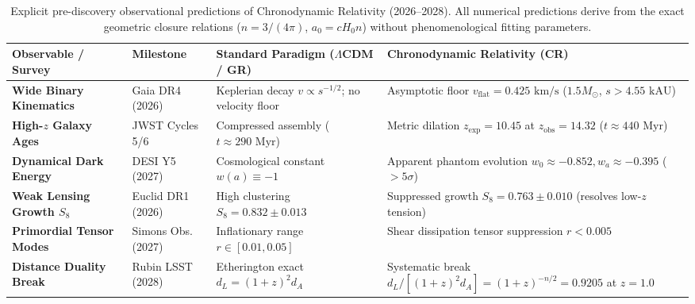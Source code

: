 \documentclass[aps,prd,reprint,superscriptaddress,nofootinbib,floatfix,amsmath,amssymb]{revtex4-2}
\begin{document}
\begin{table}[t]
\caption{\label{tab:upcoming_predictions}Explicit pre-discovery observational predictions of Chronodynamic Relativity (2026--2028). All numerical predictions derive from the exact geometric closure relations ($n = 3/(4\pi)$, $a_0 = c H_0 n$) without phenomenological fitting parameters.}
\begin{ruledtabular}
\begin{tabular}{llll}
\textbf{Observable / Survey} & \textbf{Milestone} & \textbf{Standard Paradigm ($\Lambda$CDM / GR)} & \textbf{Chronodynamic Relativity (CR)} \\
\hline
\parbox[t]{2.8cm}{\textbf{Wide Binary Kinematics}} & \parbox[t]{1.8cm}{Gaia DR4\\(2026)} & \parbox[t]{3.8cm}{Keplerian decay $v \propto s^{-1/2}$; no velocity floor} & \parbox[t]{5.0cm}{Asymptotic floor $v_{\text{flat}} = 0.425\text{ km/s}$ ($1.5 M_\odot$, $s > 4.55\text{ kAU}$)} \\
\parbox[t]{2.8cm}{\textbf{High-$z$ Galaxy Ages}} & \parbox[t]{1.8cm}{JWST Cycles 5/6} & \parbox[t]{3.8cm}{Compressed assembly ($t \approx 290\text{ Myr}$)} & \parbox[t]{5.0cm}{Metric dilation $z_{\text{exp}} = 10.45$ at $z_{\text{obs}} = 14.32$ ($t \approx 440\text{ Myr}$)} \\
\parbox[t]{2.8cm}{\textbf{Dynamical Dark Energy}} & \parbox[t]{1.8cm}{DESI Y5\\(2027)} & \parbox[t]{3.8cm}{Cosmological constant $w(a) \equiv -1$} & \parbox[t]{5.0cm}{Apparent phantom evolution $w_0 \approx -0.852, w_a \approx -0.395$ ($>5\sigma$)} \\
\parbox[t]{2.8cm}{\textbf{Weak Lensing Growth $S_8$}} & \parbox[t]{1.8cm}{Euclid DR1\\(2026)} & \parbox[t]{3.8cm}{High clustering $S_8 = 0.832 \pm 0.013$} & \parbox[t]{5.0cm}{Suppressed growth $S_8 = 0.763 \pm 0.010$ (resolves low-$z$ tension)} \\
\parbox[t]{2.8cm}{\textbf{Primordial Tensor Modes}} & \parbox[t]{1.8cm}{Simons Obs.\\(2027)} & \parbox[t]{3.8cm}{Inflationary range $r \in [0.01, 0.05]$} & \parbox[t]{5.0cm}{Shear dissipation tensor suppression $r < 0.005$} \\
\parbox[t]{2.8cm}{\textbf{Distance Duality Break}} & \parbox[t]{1.8cm}{Rubin LSST\\(2028)} & \parbox[t]{3.8cm}{Etherington exact $d_L = (1+z)^2 d_A$} & \parbox[t]{5.0cm}{Systematic break $d_L / [(1+z)^2 d_A] = (1+z)^{-n/2} = 0.9205$ at $z = 1.0$} \\
\end{tabular}
\end{ruledtabular}
\end{table}
\end{document}
